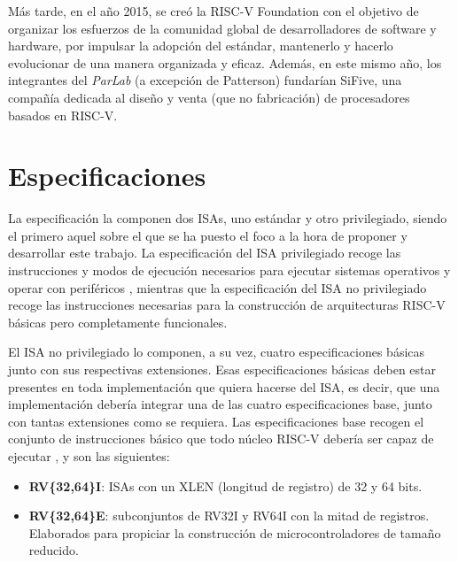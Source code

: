 Más tarde, en el año 2015, se creó la RISC-V Foundation con el objetivo de organizar los esfuerzos de la comunidad global de desarrolladores de software y hardware, por impulsar la adopción del estándar, mantenerlo y hacerlo evolucionar de una manera organizada y eficaz. Además, en este mismo año, los integrantes del \textit{ParLab} (a excepción de Patterson) fundarían SiFive, una compañía dedicada al diseño y venta (que no fabricación) de procesadores basados en RISC-V.

\section{Especificaciones}

La especificación la componen dos ISAs, uno estándar y otro privilegiado, siendo el primero aquel sobre el que se ha puesto el foco a la hora de proponer y desarrollar este trabajo. La especificación del ISA privilegiado recoge las instrucciones y modos de ejecución necesarios para ejecutar sistemas operativos y operar con periféricos \cite{riscv-unpriv-isa-20250508-priv-isa-brief}, mientras que la especificación del ISA no privilegiado recoge las instrucciones necesarias para la construcción de arquitecturas RISC-V básicas pero completamente funcionales.

El ISA no privilegiado lo componen, a su vez, cuatro especificaciones básicas junto con sus respectivas extensiones. Esas especificaciones básicas deben estar presentes en toda implementación que quiera hacerse del ISA, es decir, que una implementación debería integrar una de las cuatro especificaciones base, junto con tantas extensiones como se requiera. Las especificaciones base recogen el conjunto de instrucciones básico que todo núcleo RISC-V debería ser capaz de ejecutar  \cite{riscv-unpriv-isa-20250508-unpriv-isa-brief}, y son las siguientes:

\begin{itemize}
  \item \textbf{RV\{32,64\}I}: ISAs con un XLEN (longitud de registro) de 32 y 64 bits.
  \vspace{-0.2cm}
  \item \textbf{RV\{32,64\}E}: subconjuntos de RV32I y RV64I con la mitad de registros. Elaborados para propiciar la construcción de microcontroladores de tamaño reducido.
\end{itemize}

